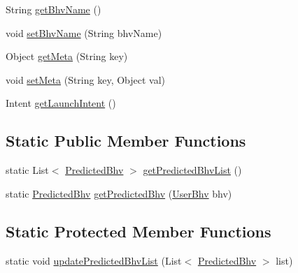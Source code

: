 \begin{DoxyCompactItemize}
\item 
\-String \hyperlink{classlab_1_1davidahn_1_1appshuttle_1_1predict_1_1_predicted_bhv_a8efb1fb595edc2cdde77e457151d24c7}{get\-Bhv\-Name} ()
\item 
void \hyperlink{classlab_1_1davidahn_1_1appshuttle_1_1predict_1_1_predicted_bhv_aaf7fcf5bbdd7b1b7c683bbc90ed3e1d6}{set\-Bhv\-Name} (\-String bhv\-Name)
\item 
\-Object \hyperlink{classlab_1_1davidahn_1_1appshuttle_1_1predict_1_1_predicted_bhv_add1eb104f5ef3b39f0356bf8a5b0cfae}{get\-Meta} (\-String key)
\item 
void \hyperlink{classlab_1_1davidahn_1_1appshuttle_1_1predict_1_1_predicted_bhv_ad7b23c48885ed3a3501ff7c523e3caa0}{set\-Meta} (\-String key, \-Object val)
\item 
\-Intent \hyperlink{classlab_1_1davidahn_1_1appshuttle_1_1predict_1_1_predicted_bhv_ac5748e139cc7923862461634349d010a}{get\-Launch\-Intent} ()
\end{DoxyCompactItemize}
\subsection*{\-Static \-Public \-Member \-Functions}
\begin{DoxyCompactItemize}
\item 
static \-List$<$ \hyperlink{classlab_1_1davidahn_1_1appshuttle_1_1predict_1_1_predicted_bhv}{\-Predicted\-Bhv} $>$ \hyperlink{classlab_1_1davidahn_1_1appshuttle_1_1predict_1_1_predicted_bhv_a0db6395d0ac0c0462c5e608e77a89ed5}{get\-Predicted\-Bhv\-List} ()
\item 
static \hyperlink{classlab_1_1davidahn_1_1appshuttle_1_1predict_1_1_predicted_bhv}{\-Predicted\-Bhv} \hyperlink{classlab_1_1davidahn_1_1appshuttle_1_1predict_1_1_predicted_bhv_a5f9374e22b172d32fb66de684a60c375}{get\-Predicted\-Bhv} (\hyperlink{interfacelab_1_1davidahn_1_1appshuttle_1_1collect_1_1bhv_1_1_user_bhv}{\-User\-Bhv} bhv)
\end{DoxyCompactItemize}
\subsection*{\-Static \-Protected \-Member \-Functions}
\begin{DoxyCompactItemize}
\item 
static void \hyperlink{classlab_1_1davidahn_1_1appshuttle_1_1predict_1_1_predicted_bhv_abfca733d5cbf44af402451e1fe62c452}{update\-Predicted\-Bhv\-List} (\-List$<$ \hyperlink{classlab_1_1davidahn_1_1appshuttle_1_1predict_1_1_predicted_bhv}{\-Predicted\-Bhv} $>$ list)
\end{DoxyCompactItemize}


